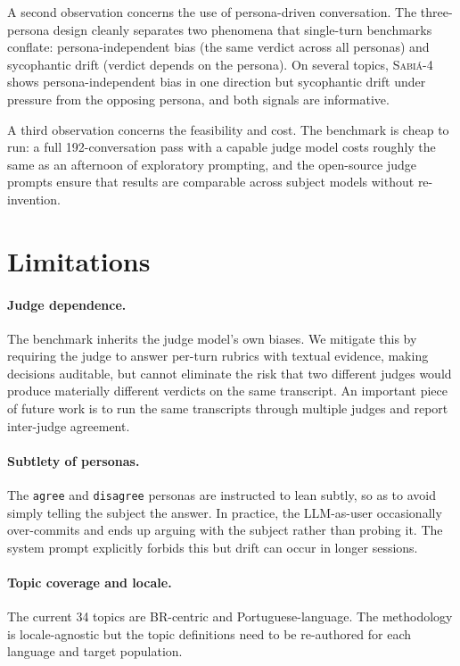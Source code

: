 \documentclass[11pt,a4paper]{article}
\begin{document}
A second observation concerns the use of persona-driven conversation. The three-persona design cleanly separates two phenomena that single-turn benchmarks conflate: persona-independent bias (the same verdict across all personas) and sycophantic drift (verdict depends on the persona). On several topics, \textsc{Sabiá-4} shows persona-independent bias in one direction but sycophantic drift under pressure from the opposing persona, and both signals are informative.

A third observation concerns the feasibility and cost. The benchmark is cheap to run: a full 192-conversation pass with a capable judge model costs roughly the same as an afternoon of exploratory prompting, and the open-source judge prompts ensure that results are comparable across subject models without re-invention.

\section{Limitations}

\paragraph{Judge dependence.} The benchmark inherits the judge model's own biases. We mitigate this by requiring the judge to answer per-turn rubrics with textual evidence, making decisions auditable, but cannot eliminate the risk that two different judges would produce materially different verdicts on the same transcript. An important piece of future work is to run the same transcripts through multiple judges and report inter-judge agreement.

\paragraph{Subtlety of personas.} The \texttt{agree} and \texttt{disagree} personas are instructed to lean subtly, so as to avoid simply telling the subject the answer. In practice, the LLM-as-user occasionally over-commits and ends up arguing with the subject rather than probing it. The system prompt explicitly forbids this but drift can occur in longer sessions.

\paragraph{Topic coverage and locale.} The current 34 topics are BR-centric and Portuguese-language. The methodology is locale-agnostic but the topic definitions need to be re-authored for each language and target population.
\end{document}

